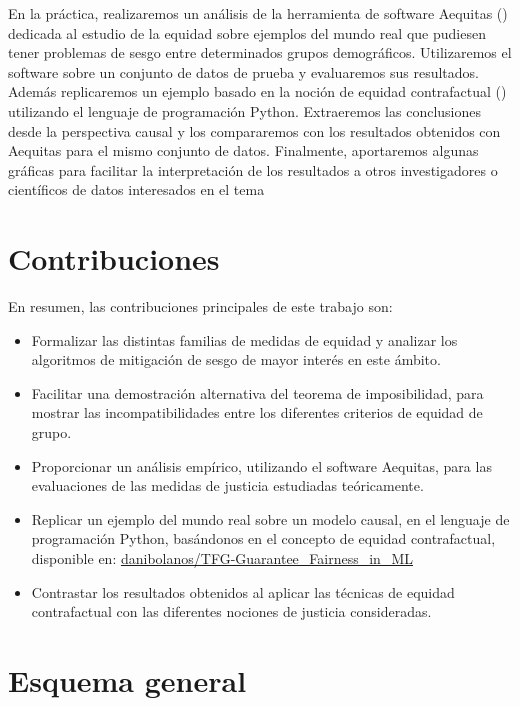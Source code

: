 \documentclass[oneside,openright,titlepage,numbers=noenddot,openany,headinclude,footinclude=true,
cleardoublepage=empty,abstractoff,BCOR=5mm,paper=a4,fontsize=12pt,main=spanish]{scrreprt}
\begin{document}
\clearpage

En la práctica, realizaremos un análisis de la herramienta de software Aequitas (\cite{aequitas2019}) dedicada al estudio de la equidad sobre ejemplos del mundo real que pudiesen tener problemas de sesgo entre determinados grupos demográficos. Utilizaremos el software sobre un conjunto de datos de prueba y evaluaremos sus resultados. Además replicaremos un ejemplo basado en la noción de equidad contrafactual (\cite{counterfactual2018}) utilizando el lenguaje de programación Python. Extraeremos las conclusiones desde la perspectiva causal y los compararemos con los resultados obtenidos con Aequitas para el mismo conjunto de datos. Finalmente, aportaremos algunas gráficas para facilitar la interpretación de los resultados a otros investigadores o científicos de datos interesados en el tema

\section{Contribuciones}

En resumen, las contribuciones principales de este trabajo son:

\begin{itemize}
    \item Formalizar las distintas familias de medidas de equidad y analizar los algoritmos de mitigación de sesgo de mayor interés en este ámbito.
    \item Facilitar una demostración alternativa del teorema de imposibilidad, para mostrar las incompatibilidades entre los diferentes criterios de equidad de grupo.
    \item Proporcionar un análisis empírico, utilizando el software Aequitas, para las evaluaciones de las medidas de justicia estudiadas teóricamente.
    \item Replicar un ejemplo del mundo real sobre un modelo causal, en el lenguaje de programación Python, basándonos en el concepto de equidad contrafactual, disponible en: \href{https://github.com/danibolanos/TFG-Guarantee_Fairness_in_ML.git}{danibolanos/TFG-Guarantee\_Fairness\_in\_ML}
    \item Contrastar los resultados obtenidos al aplicar las técnicas de equidad contrafactual con las diferentes nociones de justicia consideradas.
\end{itemize}

\section{Esquema general}
\end{document}
